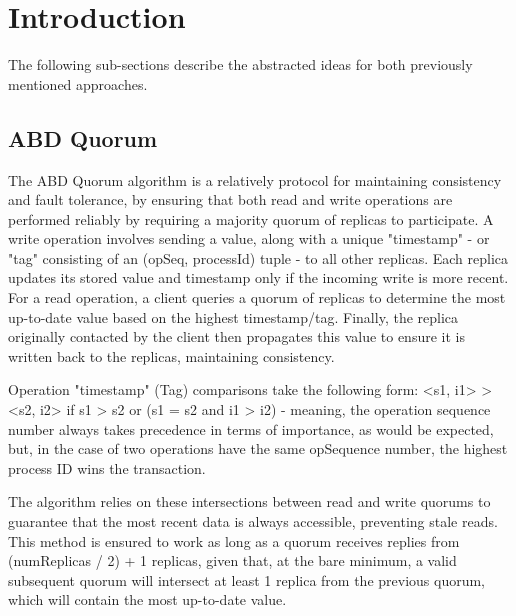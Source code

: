 \documentclass[sigconf]{acmart}
\begin{document}
\maketitle

\section{Introduction}

The following sub-sections describe the abstracted ideas for both previously mentioned approaches.

\subsection{ABD Quorum}

The ABD Quorum algorithm is a relatively protocol for maintaining consistency and fault tolerance, by ensuring that both read and write operations are performed reliably by requiring a majority quorum of replicas to participate. A write operation involves sending a value, along with a unique "timestamp" - or "tag" consisting of an (opSeq, processId) tuple - to all other replicas. Each replica updates its stored value and timestamp only if the incoming write is more recent. For a read operation, a client queries a quorum of replicas to determine the most up-to-date value based on the highest timestamp/tag. Finally, the replica originally contacted by the client then propagates this value to ensure it is written back to the replicas, maintaining consistency.

Operation "timestamp" (Tag) comparisons take the following form: <s1, i1> > <s2, i2> if s1 > s2 or (s1 = s2 and i1 > i2) - meaning, the operation sequence number always takes precedence in terms of importance, as would be expected, but, in the case of two operations have the same opSequence number, the highest process ID wins the transaction. 

The algorithm relies on these intersections between read and write quorums to guarantee that the most recent data is always accessible, preventing stale reads. This method is ensured to work as long as a quorum receives replies from (numReplicas / 2) + 1 replicas, given that, at the bare minimum, a valid subsequent quorum will intersect at least 1 replica from the previous quorum, which will contain the most up-to-date value. \\
\end{document}
